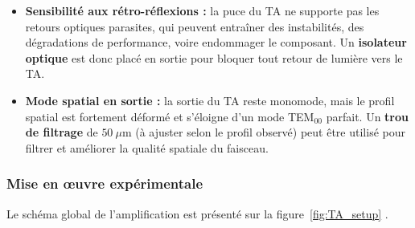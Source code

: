 \begin{itemize}[label=$\bullet$]
    \item \textbf{Sensibilité aux rétro-réflexions :} la puce du \gls{TA} ne supporte pas les retours optiques parasites, qui peuvent entraîner des instabilités, des dégradations de performance, voire endommager le composant. Un \textbf{isolateur optique} est donc placé en sortie pour bloquer tout retour de lumière vers le \gls{TA}.
    
    \item \textbf{Mode spatial en sortie :} la sortie du \gls{TA} reste monomode, mais le profil spatial est fortement déformé et s’éloigne d’un mode TEM$_{00}$ parfait. Un  \textbf{trou de filtrage} de $50~\mu$m (à ajuster selon le profil observé) peut être utilisé pour filtrer et améliorer la qualité spatiale du faisceau.
\end{itemize}

\subsubsection*{Mise en œuvre expérimentale}

Le schéma global de l’amplification est présenté sur la figure~\ref{fig:TA_setup} .

